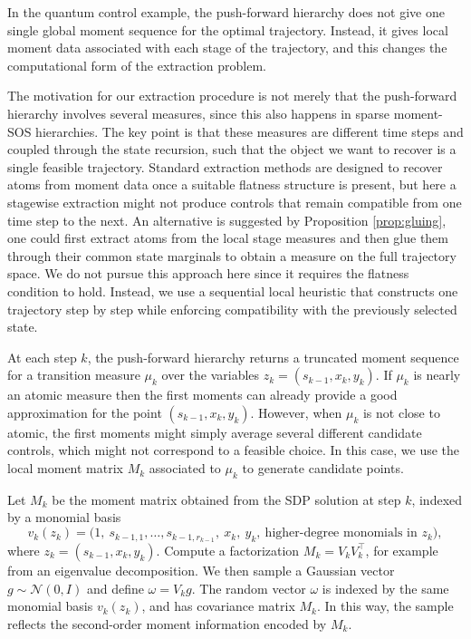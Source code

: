 \documentclass[11pt,a4paper]{article}
\theoremstyle{definition}
\begin{document}

In the quantum control example, the push-forward hierarchy does not give one single global moment sequence for the optimal trajectory. Instead, it gives local moment data associated with each stage of the trajectory, and this changes the computational form of the extraction problem.

The motivation for our extraction procedure is not merely that the push-forward hierarchy involves several measures, since this also happens in sparse moment-SOS hierarchies. The key point is that these measures are different time steps and coupled through the state recursion, such that the object we want to recover is a single feasible trajectory. Standard extraction methods are designed to recover atoms from moment data once a suitable flatness structure is present, but here a stagewise extraction might not produce controls that remain compatible from one time step to the next. An alternative is suggested by Proposition \ref{prop:gluing}, one could first extract atoms from the local stage measures and then glue them through their common state marginals to obtain a measure on the full trajectory space. We do not pursue this approach here since it requires the flatness condition to hold. Instead, we use a sequential local heuristic that constructs one trajectory step by step while enforcing compatibility with the previously selected state.

At each step $k$, the push-forward hierarchy returns a truncated moment sequence for a transition measure $\mu_k$ over the variables $z_k=(s_{k-1},x_k,y_k)$. If $\mu_k$ is nearly an atomic measure then the first moments can already provide a good approximation for the point $(s_{k-1},x_k,y_k)$. However, when $\mu_k$ is not close to atomic, the first moments might simply average several different candidate controls, which might not correspond to a feasible choice. In this case, we use the local moment matrix $M_k$ associated to $\mu_k$ to generate candidate points.

Let \(M_k\) be the moment matrix obtained from the SDP solution at step \(k\), indexed by a monomial basis
\[
v_k(z_k)=\bigl(1,\ s_{k-1,1},\dots,s_{k-1,r_{k-1}},\ x_k,\ y_k,\ \text{higher-degree monomials in } z_k\bigr),
\]
where \(z_k=(s_{k-1},x_k,y_k)\). Compute a factorization $M_k = V_k V_k^\top$, for example from an eigenvalue decomposition. We then sample a Gaussian vector \(g\sim \mathcal N(0,I)\) and define $\omega = V_k g$. The random vector \(\omega\) is indexed by the same monomial basis \(v_k(z_k)\), and has covariance matrix \(M_k\). In this way, the sample reflects the second-order moment information encoded by \(M_k\).
\end{document}
